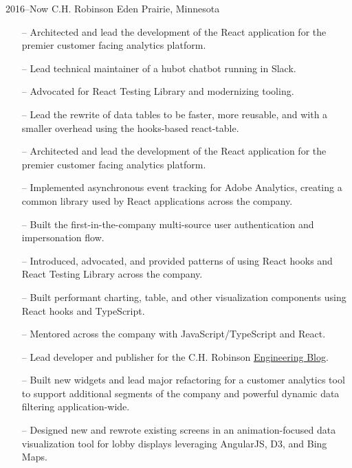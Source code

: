 \documentclass[]{cv-style} %
\begin{document}
\begin{entrylist}

\entry
{2016--Now}
{C.H. Robinson}
{Eden Prairie, Minnesota}
{
\begin{itemize}
    \item[--] Architected and lead the development of the React application for the premier customer facing analytics platform.
    \item[--] Lead technical maintainer of a hubot chatbot running in Slack.
    \item[--] Advocated for React Testing Library and modernizing tooling.
    \item[--] Lead the rewrite of data tables to be faster, more reusable, and with a smaller overhead using the hooks-based react-table.
\end{itemize}
\begin{itemize}
    \item[--] Architected and lead the development of the React application for the premier customer facing analytics platform.
    \item[--] Implemented asynchronous event tracking for Adobe Analytics, creating a common library used by React applications across the company.
    \item[--] Built the first-in-the-company multi-source user authentication and impersonation flow.
    \item[--] Introduced, advocated, and provided patterns of using React hooks and React Testing Library across the company.
    \item[--] Built performant charting, table, and other visualization components using React hooks and TypeScript.
    \item[--] Mentored across the company with JavaScript/TypeScript and React.
    \item[--] Lead developer and publisher for the C.H. Robinson \href{https://engineering.chrobinson.com}{Engineering Blog}.
\end{itemize}
\begin{itemize}
    \item[--] Built new widgets and lead major refactoring for a customer analytics tool to support additional segments of the company and powerful dynamic data filtering application-wide.
    \item[--] Designed new and rewrote existing screens in an animation-focused data visualization tool for lobby displays leveraging AngularJS, D3, and Bing Maps.
\end{itemize}}


\end{entrylist}
\end{document}
